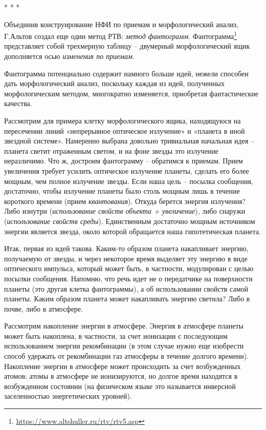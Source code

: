 \documentclass[11pt,a4paper]{article}
\begin{document}
\begin{center}
  * * *
\end{center}
Объединив конструирование НФИ по приемам и морфологический анализ, Г.Альтов
создал еще один метод РТВ: \emph{метод фантограмм}.
Фантограмма\footnote{\url{https://www.altshuller.ru/rtv/rtv5.asp}}
представляет собой трехмерную таблицу -- двумерный морфологический ящик
дополняется осью \emph{изменения по приемам}.

Фантограмма потенциально содержит намного больше идей, нежели способен дать
морфологический анализ, поскольку каждая из идей, полученных морфологическим
методом, многократно изменяется, приобретая фантастические качества.

Рассмотрим для примера клетку морфологического ящика, находящуюся на
пересечении линий «непрерывное оптическое излучение» и «планета в иной
звездной системе». Намеренно выбрана довольно тривиальная начальная идея --
планета светит отраженным светом, и на фоне звезды это излучение неразличимо.
Что ж, достроим фантограмму -- обратимся к приемам. Прием увеличения требует
усилить оптическое излучение планеты, сделать его более мощным, чем полное
излучение звезды. Если наша цель -- посылка сообщения, достаточно, чтобы
излучение планеты было столь мощным лишь в течение короткого времени (прием
\emph{квантования}). Откуда берется энергия излучения? Либо изнутри
(\emph{использование свойств объекта + увеличение}), либо снаружи
(\emph{использование свойств среды}). Единственным достаточно мощным
источником энергии является звезда, около которой обращается наша
гипотетическая планета.

Итак, первая из идей такова. Каким-то образом планета накапливает энергию,
получаемую от звезды, и через некоторое время выделяет эту энергию в виде
оптического импульса, который может быть, в частности, модулирован с целью
посылки сообщения. Напомню, что речь идет не о передатчике на поверхности
планеты (это другая клетка фантограммы), а об использовании свойств самой
планеты. Каким образом планета может накапливать энергию светила? Либо в
почве, либо в атмосфере.

Рассмотрим накопление энергии в атмосфере. Энергия в атмосфере планеты может
быть накоплена, в частности, за счет ионизации с последующим использованием
энергии рекомбинации (в этом случае нужно еще изобрести способ удержать от
рекомбинации газ атмосферы в течение долгого времени). Накопление энергии в
атмосфере может происходить за счет возбужденных атомов: атомы в атмосфере не
ионизируются, но долгое время находятся в возбужденном состоянии (на
физическом языке это называется инверсной заселенностью энергетических
уровней).
\end{document}
